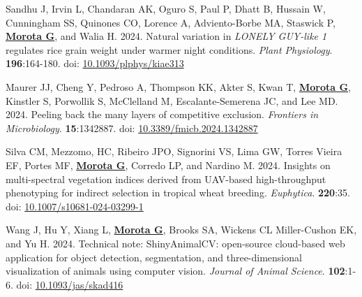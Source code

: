 \documentclass[margin,line,10pt]{res}
\newenvironment{list1}{
  \begin{list}{\ding{113}}{%
      \setlength{\itemsep}{0in}
      \setlength{\parsep}{0in} \setlength{\parskip}{0in}
      \setlength{\topsep}{0in} \setlength{\partopsep}{0in} 
      \setlength{\leftmargin}{0.17in}}}{\end{list}}
\begin{document}
\begin{resume}
\begin{list1}
  \vspace{0.5cm}


  \item  [{\bf 73}.] Sandhu J, Irvin L, Chandaran AK, Oguro S, Paul P, Dhatt B, Hussain W, Cunningham SS, Quinones CO, Lorence A, Adviento-Borbe MA, Staswick P, \textbf{\underline{Morota G}}, and Walia H. 2024. Natural variation in {\it LONELY GUY-like 1} regulates rice grain weight under warmer night conditions. \emph{Plant Physiology}. \textbf{196}:164-180. doi: \textcolor{blue}{\href{https://doi.org/10.1093/plphys/kiae313}{10.1093/plphys/kiae313}}

  \vspace{0.5cm}

  \item  [{\bf 72}.] Maurer JJ, Cheng Y, Pedroso A, Thompson KK, Akter S, Kwan T, \textbf{\underline{Morota G}}, Kinstler S, Porwollik S, McClelland M, Escalante-Semerena JC, and Lee MD. 2024. Peeling back the many layers of competitive exclusion. \emph{Frontiers in Microbiology}. \textbf{15}:1342887. doi: \textcolor{blue}{\href{https://doi.org/10.3389/fmicb.2024.1342887}{10.3389/fmicb.2024.1342887}}

  \vspace{0.5cm}

  \item  [{\bf 71}.]  Silva CM, Mezzomo, HC, Ribeiro JPO, Signorini VS, Lima GW, Torres Vieira EF, Portes MF, \textbf{\underline{Morota G}}, Corredo LP, and Nardino M. 2024. Insights on multi-spectral vegetation indices derived from UAV-based high-throughput phenotyping for indirect selection in tropical wheat breeding. \emph{Euphytica}. \textbf{220}:35. doi: \textcolor{blue}{\href{https://doi.org/10.1007/s10681-024-03299-1}{10.1007/s10681-024-03299-1}}

  \vspace{0.5cm}

  \item  [{\bf 70}.] Wang J, Hu Y, Xiang L, \textbf{\underline{Morota G}}, Brooks SA, Wickens CL Miller-Cushon EK, and Yu H. 2024. Technical note: ShinyAnimalCV: open-source cloud-based web application for object detection, segmentation, and three-dimensional visualization of animals using computer vision. \emph{Journal of Animal Science}. \textbf{102}:1-6. doi: \textcolor{blue}{\href{https://doi.org/10.1093/jas/skad416}{10.1093/jas/skad416}}


\end{list1}




\end{resume}
\end{document}
